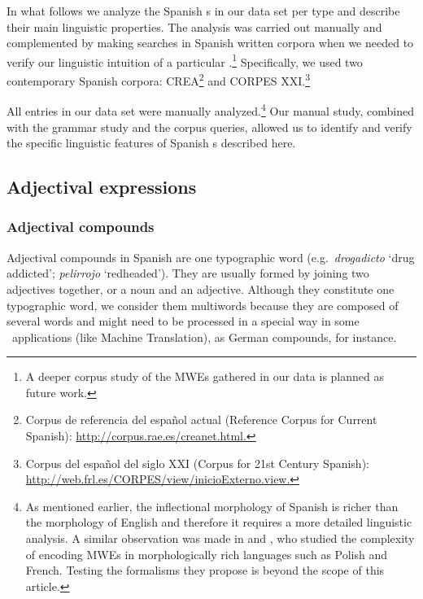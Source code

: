 \documentclass[output=paper]{langsci/langscibook}
\begin{document}
In what follows we analyze the Spanish \mwe s in our data set per type and describe their main linguistic properties.
The analysis was carried out manually and complemented by making searches in Spanish written corpora when we needed to verify our linguistic intuition of a particular \mwe.\footnote{A deeper corpus study of the MWEs gathered in our data is planned as future work.}
Specifically, we used two contemporary Spanish corpora: CREA\footnote{Corpus de referencia del español actual (Reference Corpus for Current Spanish): \url{http://corpus.rae.es/creanet.html.}} and CORPES XXI.\footnote{Corpus del español del siglo XXI (Corpus for 21st Century Spanish): \url{http://web.frl.es/CORPES/view/inicioExterno.view.}}

All entries in our data set were manually analyzed.\footnote{As mentioned earlier, the inflectional morphology of Spanish is richer than the morphology of  English and therefore it requires a more detailed linguistic analysis. A similar observation was made in \citet{Savary:2008} and \citet{Gralinski:2010}, who studied the complexity of encoding MWEs in morphologically rich languages such as Polish and French. 
Testing the formalisms they propose is beyond the scope of this article.}
Our manual study, combined with the grammar study and the corpus queries, allowed us to identify and verify the specific linguistic features of Spanish \mwe s described here.


\subsection{Adjectival expressions}
\label{sssec:adjectivalExps}

\subsubsection{Adjectival compounds}

Adjectival compounds in Spanish are one typographic word (e.g.\ \textit{drogadicto} `drug addicted'; \textit{pelirrojo} `redheaded').
They are usually formed by joining two adjectives together, or a noun and an adjective.
Although they constitute one typographic word, we consider them multiwords because they are composed of several words and might need to be processed in a special way in some \nlp\ applications (like Machine Translation), as German compounds, for instance.
\end{document}
